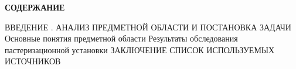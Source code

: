 {\cyrillicfont \fontsize{14pt}{0pt}\selectfont \englishfont \bfseries
    СОДЕРЖАНИЕ
    \vspace{42pt}
} 

{\cyrillicfont \fontsize{13pt}{15.6pt}\selectfont \englishfont
    ВВЕДЕНИЕ  . АНАЛИЗ ПРЕДМЕТНОЙ ОБЛАСТИ И ПОСТАНОВКА ЗАДАЧИ   Основные понятия предметной области   Результаты обследования пастеризационной установки \newline
    ЗАКЛЮЧЕНИЕ  \newline
    СПИСОК ИСПОЛЬЗУЕМЫХ ИСТОЧНИКОВ  \newline
}